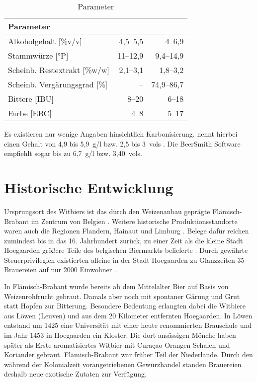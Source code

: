 \documentclass[a4paper,parskip=half]{scrartcl}
\begin{document}
\begin{table}[H]
\centering
\begin{tabular}{lrr}
\toprule
Parameter                    & \citeauthor{BJCP2015} & \citeauthor{Strottner1999} \\
\midrule
Alkoholgehalt [\%v/v]        & 4,5--5,5 & 4--6,9 \\
Stammwürze [°P]              & 11--12,9 & 9,4--14,9 \\
Scheinb. Restextrakt [\%w/w] & 2,1--3,1 & 1,8--3,2 \\
Scheinb. Vergärungsgrad [\%] & --       & 74,9--86,7 \\
Bittere [IBU]                & 8--20    & 6--18 \\
Farbe [EBC]                  & 4--8     & 5--17 \\
\bottomrule
\end{tabular}
\caption{Parameter \parencites[49]{BJCP2015}{Strottner1999}}
\label{table:parameters}
\end{table}

Es existieren nur wenige Angaben hinsichtlich Karbonisierung.
\citeauthor{Zainasheff2007} nennt hierbei einen  Gehalt von
4,9 bis 5,9~g/l bzw. 2,5 bis 3~vols \parencite{Zainasheff2007}.
Die BeerSmith Software empfiehlt sogar bis zu 6,7~g/l bzw. 3,40~vols.

\section*{Historische Entwicklung}

Ursprungsort des Witbiers ist das durch den Weizenanbau geprägte
Flämisch-Brabant im Zentrum von Belgien \parencite[44]{Roncoroni2018}.
Weitere historische Produktionsstandorte waren auch die
Regionen Flandern, Hainaut und Limburg \parencite[118]{Strottner1999}.
Belege dafür reichen zumindest bis in das 16. Jahrhundert
zurück, zu einer Zeit als die kleine Stadt Hoegaarden größere
Teile des belgischen Biermarkts belieferte \parencite[46]{Mulder2020}. 
Durch gewährte Steuerprivilegien existierten alleine in
der Stadt Hoegaarden zu Glanzzeiten 35 Brauereien auf nur 2000
Einwohner \parencite[27]{Sparrow2002}.

In Flämisch-Brabant wurde bereits ab dem Mittelalter Bier auf
Basis von Weizenrohfrucht gebraut. Damals aber noch mit
spontaner Gärung und Grut statt Hopfen zur Bitterung.
Besondere Bedeutung erlangten dabei die Witbiere aus Löwen (Leuven)
und aus dem 20 Kilometer entfernten Hoegaarden. In Löwen
entstand um 1425 eine Universität mit einer heute renommierten Brauschule
und im Jahr 1453 in Hoegaarden ein Kloster. Die dort ansässigen
Mönche haben später als Erste aromatisiertes Witbier mit
Curaçao-Orangen-Schalen und Koriander gebraut. Flämisch-Brabant war
früher Teil der Niederlande. Durch den während der
Kolonialzeit vorangetriebenen Gewürzhandel standen
Brauereien deshalb neue exotische Zutaten zur Verfügung.
\parencite[1,4]{Strottner1999}
\end{document}
